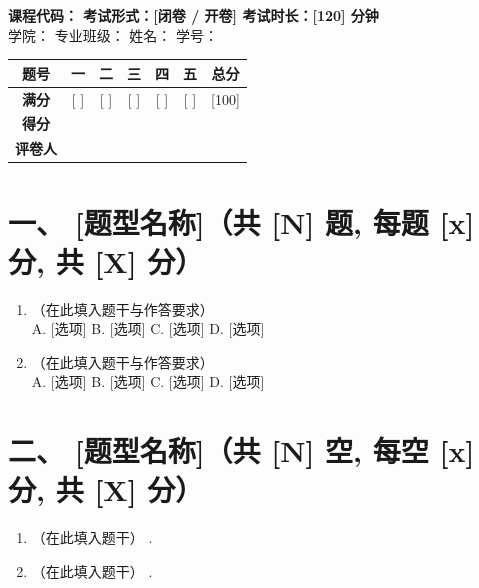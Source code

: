 \documentclass[11pt,a4paper,UTF8]{ctexart}
\begin{document}
\begin{center}
\textbf{课程代码：\underline{\hspace{2.5cm}} \qquad 考试形式：[闭卷 / 开卷] \qquad 考试时长：[120] 分钟} \\[0.2cm]
学院：\underline{\hspace{2.5cm}} 专业班级：\underline{\hspace{2.5cm}} 姓名：\underline{\hspace{2.5cm}} 学号：\underline{\hspace{2.5cm}}
\end{center}

\vspace{0.3cm}
\begin{table}[htbp]
\centering
\begin{tabular}{|c|c|c|c|c|c|c|}
\hline
\textbf{题号} & \textbf{一} & \textbf{二} & \textbf{三} & \textbf{四} & \textbf{五} & \textbf{总分} \\
\hline
\textbf{满分} & [ ] & [ ] & [ ] & [ ] & [ ] & [100] \\
\hline
\textbf{得分} & & & & & & \\
\hline
\textbf{评卷人} & & & & & & \\
\hline
\end{tabular}
\end{table}

\section*{一、 [题型名称]（共 [N] 题, 每题 [x] 分, 共 [X] 分）}
\begin{enumerate}[label=\arabic*.]
    \item （在此填入题干与作答要求）\\
    A. [选项] \qquad B. [选项] \qquad C. [选项] \qquad D. [选项]

    \item （在此填入题干与作答要求）\\
    A. [选项] \qquad B. [选项] \qquad C. [选项] \qquad D. [选项]
\end{enumerate}

\section*{二、 [题型名称]（共 [N] 空, 每空 [x] 分, 共 [X] 分）}
\begin{enumerate}[label=\arabic*.]
    \item （在此填入题干） \underline{\hspace{3cm}}.
    \item （在此填入题干） \underline{\hspace{3cm}}.
\end{enumerate}
\end{document}
